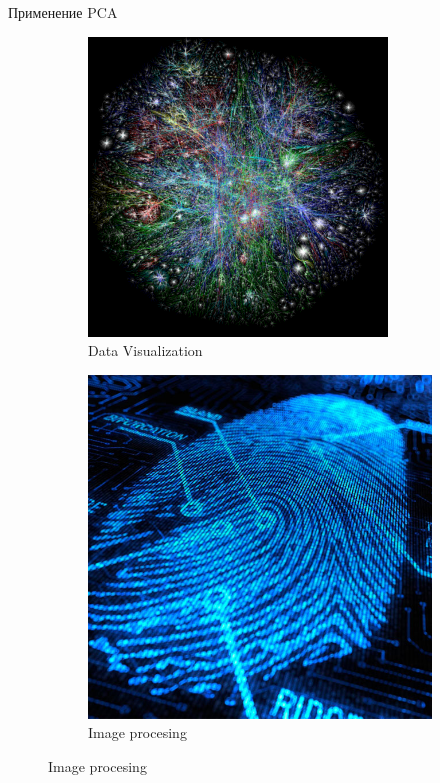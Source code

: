 \documentclass[10pt]{beamer}
\begin{document}
\begin{frame}{Применение PCA}
\begin{figure}
    \centering
    \begin{subfigure}[b]{0.4\textwidth}
        \includegraphics[width=\textwidth]{images/datavisualization.png}
        \caption{Data Visualization}
    \end{subfigure}
    \begin{subfigure}[b]{0.4\textwidth}
        \includegraphics[width=\textwidth]{images/imageprocessing.jpg}
        \caption{Image procesing}
    \end{subfigure}


\end{figure}
\end{frame}
\end{document}
